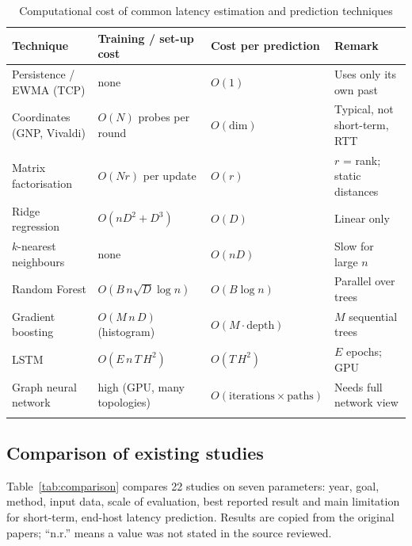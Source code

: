 \documentclass[pdflatex,sn-mathphys-num]{sn-jnl}
\begin{document}
\begin{table}[h]
\caption{Computational cost of common latency estimation and prediction techniques}\label{tab:complexity}
\centering
\footnotesize
\begin{tabular}{@{}p{3.3cm}p{3.3cm}p{2.6cm}p{3.4cm}@{}}
\toprule
Technique & Training / set-up cost & Cost per prediction & Remark \\
\midrule
Persistence / EWMA (TCP) \cite{rfc6298} & none & $O(1)$ & Uses only its own past \\
Coordinates (GNP, Vivaldi) \cite{ng2002gnp,dabek2004vivaldi} & $O(N)$ probes per round & $O(\text{dim})$ & Typical, not short-term, RTT \\
Matrix factorisation \cite{mao2006ides,liao2012dmfsgd} & $O(N r)$ per update & $O(r)$ & $r$ = rank; static distances \\
Ridge regression & $O(nD^2 + D^3)$ & $O(D)$ & Linear only \\
$k$-nearest neighbours & none & $O(nD)$ & Slow for large $n$ \\
Random Forest \cite{breiman2001rf} & $O(B\,n\sqrt{D}\log n)$ & $O(B\log n)$ & Parallel over trees \\
Gradient boosting \cite{friedman2001gbm,ke2017lightgbm} & $O(M\,n\,D)$ (histogram) & $O(M\cdot\text{depth})$ & $M$ sequential trees \\
LSTM \cite{hochreiter1997lstm,hagos2019rtt} & $O(E\,n\,T\,H^2)$ & $O(T\,H^2)$ & $E$ epochs; GPU \\
Graph neural network \cite{rusek2020routenet} & high (GPU, many topologies) & $O(\text{iterations}\times\text{paths})$ & Needs full network view \\
\botrule
\end{tabular}
\end{table}

\subsection{Comparison of existing studies}

Table~\ref{tab:comparison} compares 22 studies on seven parameters: year, goal, method, input data, scale of evaluation, best reported result and main limitation for short-term, end-host latency prediction. Results are copied from the original papers; ``n.r.'' means a value was not stated in the source reviewed.
\end{document}
